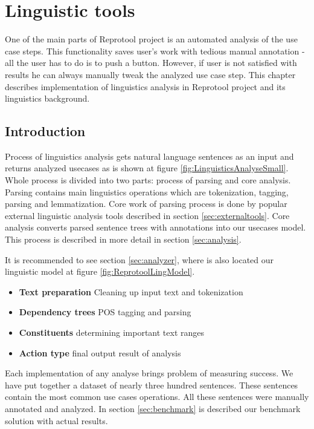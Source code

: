 \section{Linguistic tools}

One of the main parts of Reprotool project is an automated analysis of the use case steps. This functionality saves user's work with tedious manual annotation - all the user has to do is to push a button. However, if user is not satisfied with results he can always manually tweak the analyzed use case step. This chapter describes implementation of linguistics analysis in Reprotool project and its linguistics background.

\subsection{Introduction}
Process of linguistics analysis gets natural language sentences as an input and returns analyzed usecases as is shown at figure \ref{fig:LinguisticsAnalyseSmall}. Whole process is divided into two parts: process of parsing and core analysis. Parsing contains main linguistics operations which are tokenization, tagging, parsing and lemmatization. Core work of parsing process is done by popular external linguistic analysis tools described in section \ref{sec:externaltools}. Core analysis converts parsed sentence trees with annotations into our usecases model. This process is described in more detail in section \ref{sec:analysis}. 

It is recommended to see section \ref{sec:analyzer}, where is also located our linguistic model at figure \ref{fig:ReprotoolLingModel}.

\begin{itemize}
\item {\bf Text preparation} Cleaning up input text and tokenization
\item {\bf Dependency trees} POS tagging and parsing
\item {\bf Constituents} determining important text ranges
\item {\bf Action type} final output result of analysis
\end{itemize}

Each implementation of any analyse brings problem of measuring success. We have put together a dataset of nearly three hundred sentences. These sentences contain the most common use cases operations. All these sentences were manually annotated and analyzed. In section \ref{sec:benchmark} is described our benchmark solution with actual results.

